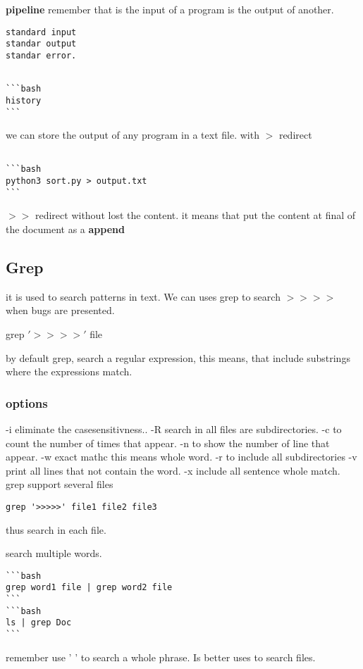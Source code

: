 \documentclass[10pt,a4paper]{article}
\begin{document}
\textbf{pipeline}
remember that is the input of a program is the 
output of another.
\begin{verbatim}
standard input
standar output
standar error.
\end{verbatim}

\begin{verbatim}

```bash
history
```
\end{verbatim}

we can store the output of any program in  a
text file. with $>$ redirect 

\begin{verbatim}

```bash
python3 sort.py > output.txt
```
\end{verbatim}


$>>$ redirect without lost the content. it means that put the content at final of the document as a \textbf{append}



\subsection{Grep}

 it is used to search patterns in text. We can uses grep to search $>>>>$  when bugs are presented.

grep $'>>>>'$ file

by default grep, search a regular expression, 
this means, that include substrings where the expressions match.

\subsubsection{options}

\begin{itemize}
-i eliminate the casesensitivness..
-R search in all files are subdirectories.
-c to count the number of times that appear.
-n to show the number of line that appear.
-w exact mathc this means whole word.
-r to include all subdirectories
-v print all lines that not contain the word.
-x include all sentence whole match.
grep support several files
\end{itemize}

\begin{verbatim}
grep '>>>>>' file1 file2 file3
\end{verbatim}
thus search in each file.

search multiple words.
\begin{verbatim}
```bash 
grep word1 file | grep word2 file
```
```bash
ls | grep Doc
```
\end{verbatim}
remember use ' ' to search a whole phrase. Is better uses   to search files.
\end{document}
